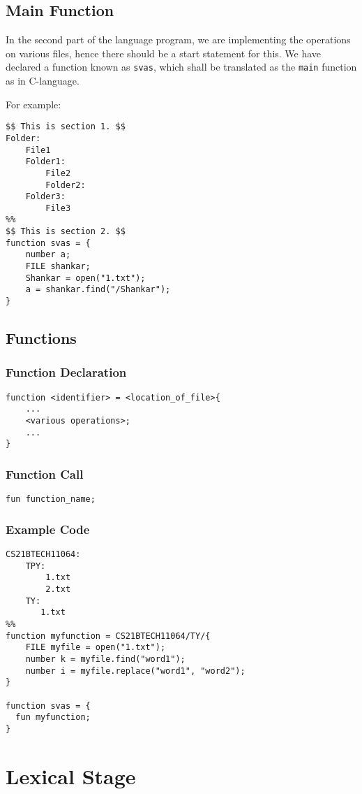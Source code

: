 \documentclass{article}
\begin{document}
\subsection{Main Function}
In the second part of the language program, we are implementing the operations on various files, hence there should be a start statement for this. We have declared a function known as \texttt{svas}, which shall be translated as the \texttt{main} function as in C-language.

For example:
\begin{verbatim}
$$ This is section 1. $$
Folder:
    File1
    Folder1:
        File2
        Folder2:
    Folder3:
        File3
%%
$$ This is section 2. $$
function svas = {
    number a;
    FILE shankar;
    Shankar = open("1.txt");
    a = shankar.find("/Shankar");
}
\end{verbatim}
\subsection{Functions}
\subsubsection{Function Declaration}
\begin{verbatim}
function <identifier> = <location_of_file>{
    ...
    <various operations>;
    ...
}
\end{verbatim}

\subsubsection{Function Call}
\begin{verbatim}
fun function_name;
\end{verbatim}

\subsubsection{Example Code}
\begin{verbatim}
CS21BTECH11064:
    TPY:
        1.txt
        2.txt
    TY:
       1.txt
%%
function myfunction = CS21BTECH11064/TY/{
    FILE myfile = open("1.txt");
    number k = myfile.find("word1");
    number i = myfile.replace("word1", "word2");
}

function svas = {
  fun myfunction;
}
\end{verbatim}

\section{Lexical Stage}
\end{document}
